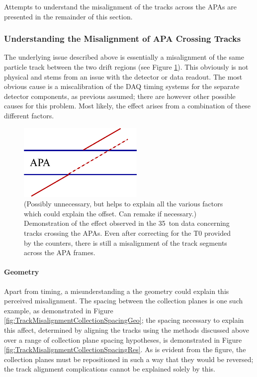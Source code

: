 Attempts to understand the misalignment of the tracks across the APAs are presented in the remainder of this section.

\subsubsection{Understanding the Misalignment of APA Crossing Tracks}\label{sec:APACrossingMisalignment}

The underlying issue described above is essentially a misalignment of the same particle track between the two drift regions (see Figure \ref{fig:TrackMisalignment}).  This obviously is not physical and stems from an issue with the detector or data readout.  The most obvious cause is a miscalibration of the DAQ timing systems for the separate detector components, as previous assumed; there are however other possible causes for this problem.  Most likely, the effect arises from a combination of these different factors.

\begin{figure}[h]
  \centering
  \includegraphics[width=6cm]{misalign_track_geo.eps}
  \caption[Demonstration of the effect observed in the 35~ton data concerning tracks crossing the APAs.]{(Possibly unnecessary, but helps to explain all the various factors which could explain the offset. Can remake if necessary.) Demonstration of the effect observed in the 35~ton data concerning tracks crossing the APAs.  Even after correcting for the T0 provided by the counters, there is still a misalignment of the track segments across the APA frames.}
  \label{fig:TrackMisalignment}
\end{figure}

\paragraph{Geometry}

Apart from timing, a misunderstanding a the geometry could explain this perceived misalignment.  The spacing between the collection planes is one such example, as demonstrated in Figure \ref{fig:TrackMisalignmentCollectionSpacingGeo}; the spacing necessary to explain this affect, determined by aligning the tracks using the methods discussed above over a range of collection plane spacing hypotheses, is demonstrated in Figure \ref{fig:TrackMisalignmentCollectionSpacingRes}.  As is evident from the figure, the collection planes must be repositioned in such a way that they would be reversed; the track alignment complications cannot be explained solely by this.

